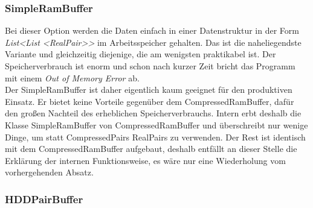 \documentclass[12pt,a4paper]{article}
\begin{document}
\subsubsection{SimpleRamBuffer}
\label{sec:simplerambuffer}
Bei dieser Option werden die Daten einfach in einer Datenstruktur in der Form \textit{List<List <RealPair>>} im Arbeitsspeicher gehalten. Das ist die naheliegendste Variante und gleichzeitig diejenige, die am wenigsten praktikabel ist. Der Speicherverbrauch ist enorm und schon nach kurzer Zeit bricht das Programm mit einem \textit{Out of Memory Error} ab. \\
Der SimpleRamBuffer ist daher eigentlich kaum geeignet für den produktiven Einsatz. Er bietet keine Vorteile gegenüber dem CompressedRamBuffer, dafür den großen Nachteil des erheblichen Speicherverbrauchs. Intern erbt deshalb die Klasse SimpleRamBuffer von CompressedRamBuffer und überschreibt nur wenige Dinge, um statt CompressedPairs RealPairs zu verwenden. Der Rest ist identisch mit dem CompressedRamBuffer aufgebaut, deshalb entfällt an dieser Stelle die Erklärung der internen Funktionsweise, es wäre nur eine Wiederholung vom vorhergehenden Absatz. \\



\subsubsection{HDDPairBuffer}
\label{sec:hddBuffer}
\end{document}

